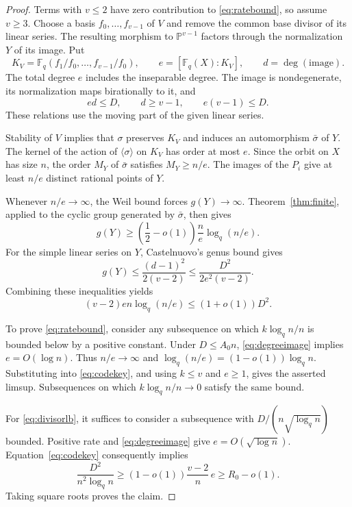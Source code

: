 \documentclass[12pt,onecolumn,draftclsnofoot,letterpaper]{IEEEtran}
\theoremstyle{remark}
\newcommand{\F}{\mathbb F}
\begin{document}
\begin{proof}
Terms with $v\le2$ have zero contribution to \eqref{eq:ratebound}, so assume $v\ge3$. Choose a basis $f_0,\ldots,f_{v-1}$ of $V$ and remove the common base divisor of its linear series. The resulting morphism to $\mathbb P^{v-1}$ factors through the normalization $Y$ of its image. Put
\begin{equation}
 K_V=\F_q(f_1/f_0,\ldots,f_{v-1}/f_0),\qquad
 e=[\F_q(X):K_V],\qquad d=\deg(\text{image}).
 \label{eq:image}
\end{equation}
The total degree $e$ includes the inseparable degree. The image is nondegenerate, its normalization maps birationally to it, and
\begin{equation}
 ed\le D,\qquad d\ge v-1,
 \qquad e(v-1)\le D.
 \label{eq:degreeimage}
\end{equation}
These relations use the moving part of the given linear series.

Stability of $V$ implies that $\sigma$ preserves $K_V$ and induces an automorphism $\bar\sigma$ of $Y$. The kernel of the action of $\langle\sigma\rangle$ on $K_V$ has order at most $e$. Since the orbit on $X$ has size $n$, the order $M_Y$ of $\bar\sigma$ satisfies $M_Y\ge n/e$. The images of the $P_i$ give at least $n/e$ distinct rational points of $Y$.

Whenever $n/e\to\infty$, the Weil bound forces $g(Y)\to\infty$. Theorem~\ref{thm:finite}, applied to the cyclic group generated by $\bar\sigma$, then gives
\begin{equation}
 g(Y)\ge\left(\frac12-o(1)\right)
             \frac ne\log_q(n/e).
 \label{eq:imagegenuslower}
\end{equation}
For the simple linear series on $Y$, Castelnuovo's genus bound \cite[eq.~(2.5)]{abdon} gives
\begin{equation}
 g(Y)\le\frac{(d-1)^2}{2(v-2)}
       \le\frac{D^2}{2e^2(v-2)}.
 \label{eq:imagegenusupper}
\end{equation}
Combining these inequalities yields
\begin{equation}
 (v-2)e n\log_q(n/e)\le(1+o(1))D^2.
 \label{eq:codekey}
\end{equation}

To prove \eqref{eq:ratebound}, consider any subsequence on which $k\log_qn/n$ is bounded below by a positive constant. Under $D\le A_0n$, \eqref{eq:degreeimage} implies $e=O(\log n)$. Thus $n/e\to\infty$ and $\log_q(n/e)=(1-o(1))\log_qn$. Substituting into \eqref{eq:codekey}, and using $k\le v$ and $e\ge1$, gives the asserted limsup. Subsequences on which $k\log_qn/n\to0$ satisfy the same bound.

For \eqref{eq:divisorlb}, it suffices to consider a subsequence with $D/(n\sqrt{\log_qn})$ bounded. Positive rate and \eqref{eq:degreeimage} give $e=O(\sqrt{\log n})$. Equation~\eqref{eq:codekey} consequently implies
\[
 \frac{D^2}{n^2\log_qn}
 \ge(1-o(1))\frac{v-2}{n}\,e
 \ge R_0-o(1).
\]
Taking square roots proves the claim.
\end{proof}
\end{document}

